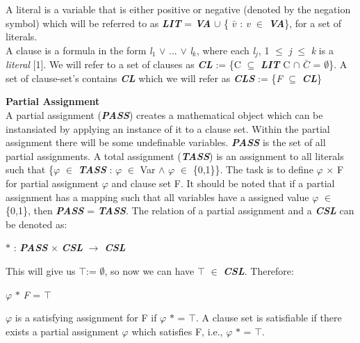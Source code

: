 \documentclass[11pt,a4paper]{article}
\begin{document}
A literal is a variable that is either positive or negative (denoted by the negation symbol) which will be referred to as \textbf{\textit{LIT}} =  \textit{\textbf{VA}} $\cup$ \{ \textit{$\bar{v}$} : \textit{v} $\in$ \textbf{\textit{VA}}\}, for a set of literals.\\

A clause is a formula in the form \textit{l$_1$} $\lor$ ... $\lor$ \textit{l$_k$}, where each \textit{l$_j$}, 1 $\le$ \textit{j} $\le$ \textit{k} is a \textit{literal} [1]. We will refer to a set of clauses as \textbf{\textit{CL}} := \{C $\subseteq$ \textbf{\textit{LIT}} C $\cap$ $\bar{C}$ = $\emptyset$\}. A set of clause-set's contains \textbf{\textit{CL}} which we will refer as \textbf{\textit{CLS}} := \{\textit{F} $\subseteq$ \textit{\textbf{CL}}\}  
\newline

\textbf{Partial Assignment}\\
\indent A partial assignment (\textbf{\textit{PASS}}) creates a mathematical object which can be instansiated by applying an instance of it to a clause set. Within the partial assignment there will be some undefinable variables. \textbf{\textit{PASS}} is the set of all partial assignments. 
A total assignment (\textbf{\textit{TASS}}) is an assignment to all literals such that \{\textit{$\varphi$} $\in$ \textbf{\textit{TASS}} : \textit{$\varphi$} $\in$ Var $\land$ \textit{$\varphi$} $\in$ \{0,1\}\}. The task is to define $\varphi$ $\times$ F for partial assignment $\varphi$ and clause set F. It should be noted that if a partial assignment has a mapping such that all variables have a assigned value \textit{$\varphi$} $\in$
\{0,1\}, then \textbf{\textit{PASS}} = \textbf{\textit{TASS}}. 
The relation of a partial assignment and a \textbf{\textit{CSL}} can be denoted as: \newline
\begin{center}
$\ast$ : \textbf{\textit{PASS}} $\times$ \textbf{\textit{CSL}} $\rightarrow$ \textbf{\textit{CSL}}
\end{center}
This will give us $\top$:= $\emptyset$, so now we can have $\top$ $\in$ \textbf{\textit{CSL}}. Therefore:

\begin{center}
$\varphi$ $\ast$ \textit{F} = $\top$
\end{center}
$\varphi$ is a satisfying assignment for F if $\varphi$ $\ast$ = $\top$. A clause set is satisfiable if there exists a partial assignment $\varphi$ which satisfies F, i.e., $\varphi$ $\ast$ = $\top$. \newline
\end{document}
